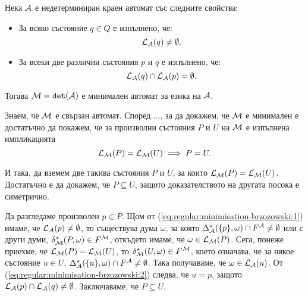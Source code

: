 \begin{proposition}
  \label{pr:regular:brzozowski-minimal:det}
  Нека $\mathcal{A}$ е недетерминиран краен автомат със следните свойства:
  \begin{itemize}
  \item
    За всяко състояние $q \in Q$ е изпълнено, че:
    \begin{equation}
      \label{eq:regular:minimisation-brzozowski:1}      
      \mathcal{L}_{\mathcal{A}}(q) \neq \emptyset.
    \end{equation}
  \item
    За всеки две различни състояния $p$ и $q$ е изпълнено, че:
    \begin{equation}
      \label{eq:regular:minimisation-brzozowski:2}
      \mathcal{L}_{\mathcal{A}}(q) \cap \mathcal{L}_{\mathcal{A}}(p) = \emptyset.
    \end{equation}
  \end{itemize}
  Тогава $\mathcal{M} = \texttt{det}(\mathcal{A})$ е минимален автомат за езика на $\mathcal{A}$.
\end{proposition}
\begin{hint}
  Знаем, че $\mathcal{M}$ е свързан автомат. Според ..., за да докажем, че $\mathcal{M}$ е минимален е достатъчно да
  покажем, че за произволни състояния $P$ и $U$ на $\mathcal{M}$ е изпълнена импликацията
  \[\mathcal{L}_{\mathcal{M}}(P) = \mathcal{L}_{\mathcal{M}}(U) \implies P = U.\]

  И така, да вземем две такива състояния $P$ и $U$, за които $\mathcal{L}_{\mathcal{M}}(P) = \mathcal{L}_{\mathcal{M}}(U)$.
  Достатъчно е да докажем, че $P \subseteq U$, защото доказателството на другата посока е симетрично.

  Да разгледаме произволен $p \in P$. Щом от (\ref{eq:regular:minimisation-brzozowski:1}) имаме, че $\mathcal{L}_{\mathcal{A}}(p) \neq \emptyset$, то съществува дума $\omega$,
  за която $\Delta^\star_{\mathcal{A}}(\{p\},\omega) \cap F^{\mathcal{A}} \neq \emptyset$
  или с други думи,
  $\delta^\star_{\mathcal{M}}(P,\omega) \in F^{\mathcal{M}}$, откъдето имаме, че $\omega \in \mathcal{L}_{\mathcal{M}}(P)$.
  Сега, понеже приехме, че $\mathcal{L}_{\mathcal{M}}(P) = \mathcal{L}_{\mathcal{M}}(U)$, то $\delta^\star_{\mathcal{M}}(U,\omega) \in F^{\mathcal{M}}$,
  което означава, че за някое състояние $u \in U$, $\Delta^\star_{\mathcal{A}}(\{u\},\omega) \cap F^{\mathcal{A}} \neq \emptyset$.
  Така получаваме, че $\omega \in \mathcal{L}_{\mathcal{A}}(u)$. От (\ref{eq:regular:minimisation-brzozowski:2}) следва, че
  $u = p$, защото $\mathcal{L}_{\mathcal{A}}(p) \cap \mathcal{L}_{\mathcal{A}}(q) \neq \emptyset$. Заключаваме, че $P \subseteq U$.
\end{hint}


